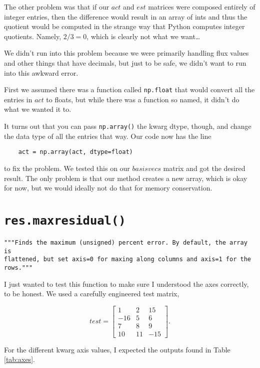 \documentclass{article}
\begin{document}
The other problem was that if our $act$ and $est$ matrices were
composed entirely of integer entries, then the difference would result in
an array of ints and thus the quotient would be computed in the
strange way that Python computes integer quotients.  Namely, $2/3 = 0$,
which is clearly not what we want\ldots

We didn't run into this problem because we were primarily handling
flux values and other things that have decimals, but just to be safe,
we didn't want to run into this awkward error.

First we assumed there was a function called \verb|np.float| that
would convert all the entries in $act$ to floats, but while there was
a function so named, it didn't do what we wanted it to.

It turns out that you can pass \verb|np.array()| the kwarg dtype,
though, and change the data type of all the entries that way.  Our
code now has the line

\begin{verbatim}
    act = np.array(act, dtype=float)
\end{verbatim}
to fix the problem.  We tested this on our $basisvecs$ matrix and got
the desired result.  The only problem is that our method creates a new
array, which is okay for now, but we would ideally not do that for
memory conservation. 


\section{\texttt{res.maxresidual()}}
\label{sec:maxresidual}
\begin{verbatim}
"""Finds the maximum (unsigned) percent error. By default, the array is
flattened, but set axis=0 for maxing along columns and axis=1 for the
rows."""
\end{verbatim}

I just wanted to test this function to make sure I understood the axes
correctly, to be honest.  We used a carefully engineered test matrix,

\[test= \left[ \begin{array}{ccc}
1 & 2 & 15 \\
-16 & 5 & 6 \\
7 & 8 & 9 \\
10 & 11 & -15
\end{array} \right]. \]

For the different kwarg axis values, I expected the outputs found in
Table \ref{tab:axes}.
\end{document}
